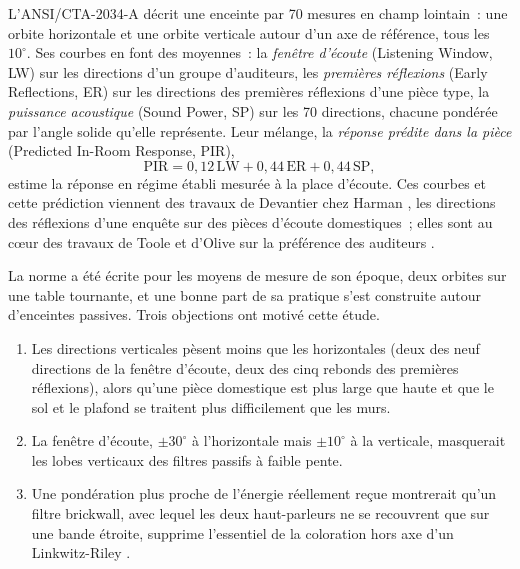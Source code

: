 \documentclass[11pt,a4paper]{article}
\begin{document}
L'ANSI/CTA-2034-A \cite{cta2034a} décrit une enceinte par 70 mesures en champ lointain~: une orbite
horizontale et une orbite verticale autour d'un axe de référence, tous les $10^\circ$. Ses courbes en
font des moyennes~: la \emph{fenêtre d'écoute} (Listening Window, LW) sur les directions d'un groupe
d'auditeurs, les \emph{premières réflexions} (Early Reflections, ER) sur les directions des premières
réflexions d'une pièce type, la \emph{puissance acoustique} (Sound Power, SP) sur les 70 directions,
chacune pondérée par l'angle solide qu'elle représente. Leur mélange, la \emph{réponse prédite dans
la pièce} (Predicted In-Room Response, PIR),
\begin{equation}
\mathrm{PIR} = 0,12\,\mathrm{LW} + 0,44\,\mathrm{ER} + 0,44\,\mathrm{SP},
\end{equation}
estime la réponse en régime établi mesurée à la place d'écoute. Ces courbes et cette prédiction
viennent des travaux de Devantier chez Harman \cite{devantier2002}, les directions des réflexions d'une
enquête sur des pièces d'écoute domestiques~; elles sont au cœur des travaux de Toole et d'Olive sur la
préférence des auditeurs \cite{toole2018,olive2004}.

La norme a été écrite pour les moyens de mesure de son époque, deux orbites sur une table tournante, et
une bonne part de sa pratique s'est construite autour d'enceintes passives. Trois objections ont motivé
cette étude.

\begin{enumerate}
\item Les directions verticales pèsent moins que les horizontales (deux des neuf directions de la
fenêtre d'écoute, deux des cinq rebonds des premières réflexions), alors qu'une pièce domestique est
plus large que haute et que le sol et le plafond se traitent plus difficilement que les murs.
\item La fenêtre d'écoute, $\pm30^\circ$ à l'horizontale mais $\pm10^\circ$ à la verticale, masquerait les
lobes verticaux des filtres passifs à faible pente.
\item Une pondération plus proche de l'énergie réellement reçue montrerait qu'un filtre brickwall, avec
lequel les deux haut-parleurs ne se recouvrent que sur une bande étroite, supprime l'essentiel de la
coloration hors axe d'un Linkwitz-Riley \cite{demion2026}.
\end{enumerate}
\end{document}
